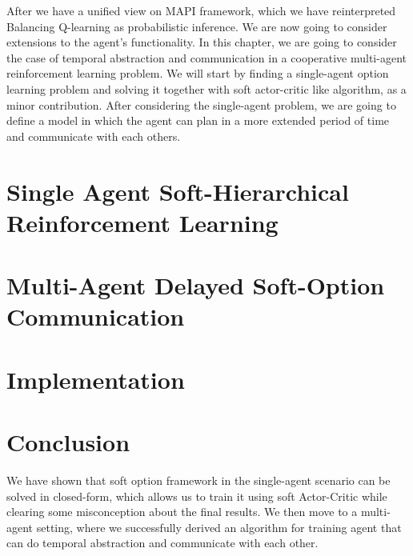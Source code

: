 \label{chapter:chap4}
\begin{miniabstract}
After we have a unified view on MAPI framework, which we have reinterpreted Balancing Q-learning \cite{grau2018balancing} as probabilistic inference. We are now going to consider extensions to the agent's functionality. In this chapter, we are going to consider the case of temporal abstraction and communication in a cooperative multi-agent reinforcement learning problem. We will start by finding a single-agent option learning problem and solving it together with soft actor-critic like algorithm, as a minor contribution. After considering the single-agent problem, we are going to define a model in which the agent can plan in a more extended period of time and communicate with each others. 
\end{miniabstract}


\section{Single Agent Soft-Hierarchical Reinforcement Learning}


\section{Multi-Agent Delayed Soft-Option Communication}


\section{Implementation}


\section{Conclusion}
We have shown that soft option framework in the single-agent scenario can be solved in closed-form, which allows us to train it using soft Actor-Critic while clearing some misconception about the final results. We then move to a multi-agent setting, where we successfully derived an algorithm for training agent that can do temporal abstraction and communicate with each other. 
